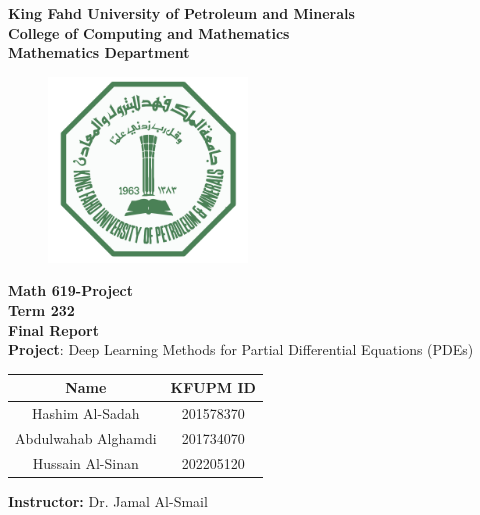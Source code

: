 \graphicspath{{./images}}

\begin{center}
    \doublespacing
    {\Large \textbf{King Fahd University of Petroleum and Minerals} }\\ 
    {\large \textbf{
    College of Computing and Mathematics\\
    Mathematics Department 
    } } 
\end{center} 

\begin{figure}[h]
    \centering
    \includegraphics[width=200px]{images/KFUPM_LOGO}
\end{figure}

\begin{center}\onehalfspacing
    \Large \textbf{Math 619-Project}\\
    \normalsize \textbf{Term 232} \\
    \Large \textbf{Final Report}\\
    \textbf{Project}: Deep Learning Methods for Partial Differential Equations (PDEs)
\end{center}
\vspace{1em}
\large
\begin{center}
\bgroup
\def\arraystretch{1.3}
\begin{tabular}{|c|c|}
    \hline
    \textbf{Name} & \textbf{KFUPM ID} \\
    \hline
    Hashim Al-Sadah & 201578370\\
    \hline
    Abdulwahab Alghamdi & 201734070\\
    \hline
    Hussain Al-Sinan & 202205120\\
    \hline 
\end{tabular}
\egroup
\end{center}
\vspace{1em}
\begin{center}
    \textbf{Instructor:} Dr. Jamal Al-Smail
\end{center}
\normalsize

